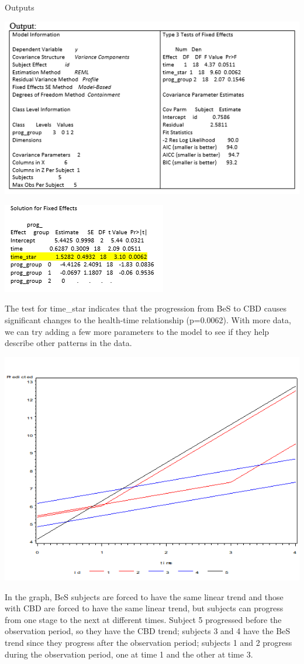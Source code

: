 \documentclass[
  9pt,
  ignorenonframetext,
]{beamer}
\begin{document}
\begin{frame}{Outputs}
\protect\hypertarget{outputs}{}
\begin{center}\includegraphics[width=0.7\linewidth]{figs_L12/f3} \end{center}

\begin{center}\includegraphics[width=0.4\linewidth]{figs_L12/f4} \end{center}
\end{frame}

\begin{frame}{}
\protect\hypertarget{section-4}{}
The test for time\_star indicates that the progression from BeS to CBD
causes significant changes to the health-time relationship (p=0.0062).
With more data, we can try adding a few more parameters to the model to
see if they help describe other patterns in the data.

\begin{center}\includegraphics[width=0.5\linewidth]{figs_L12/f5} \end{center}

In the graph, BeS subjects are forced to have the same linear trend and
those with CBD are forced to have the same linear trend, but subjects
can progress from one stage to the next at different times. Subject 5
progressed before the observation period, so they have the CBD trend;
subjects 3 and 4 have the BeS trend since they progress after the
observation period; subjects 1 and 2 progress during the observation
period, one at time 1 and the other at time 3.
\end{frame}
\end{document}
